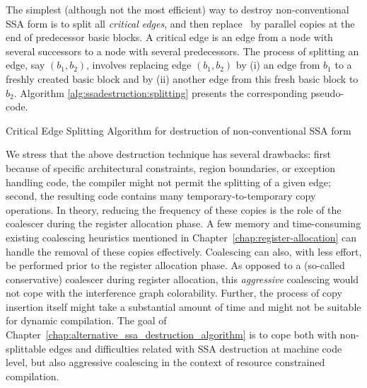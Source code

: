 The simplest (although not the most efficient) way to destroy non-conventional SSA form is to split all \textit{critical edges}, and then replace \phiops\ by parallel copies at the end of predecessor basic blocks.
A critical edge is an edge from a node with several successors to a node with several predecessors.
The process of splitting an edge, say $(b_1,b_2)$,
involves replacing edge $(b_1, b_2)$ by (i) an
edge from $b_1$ to a freshly created basic block 
and by (ii) another edge from this fresh basic block to $b_2$. 
Algorithm \ref{alg:ssadestruction:splitting} presents
the corresponding pseudo-code.

\begin{algorithm}
\caption{\label{alg:ssadestruction:splitting}Critical Edge Splitting Algorithm for destruction of non-conventional SSA form}
\end{algorithm}



We stress that the above destruction technique has several drawbacks: first because of specific architectural constraints, region boundaries, or exception handling code, the compiler might not permit the splitting of a given edge; second, the resulting code contains many temporary-to-temporary copy operations. In theory, reducing the frequency of these copies is the role of the coalescer during the register allocation phase. A few memory and time-consuming existing coalescing heuristics mentioned in Chapter~\ref{chap:register-allocation} can handle the removal of these copies effectively. Coalescing can also, with less effort, be performed prior to the register allocation phase. As opposed to a (so-called conservative) coalescer during register allocation, this \emph{aggressive} coalescing would not cope with the interference graph colorability. Further, the process of copy insertion itself might take a substantial amount of time and might not be suitable for dynamic compilation. The goal of Chapter~\ref{chap:alternative_ssa_destruction_algorithm} is to cope both with non-splittable edges and difficulties related with SSA destruction at machine code level, but also aggressive coalescing in the context of resource constrained compilation.

